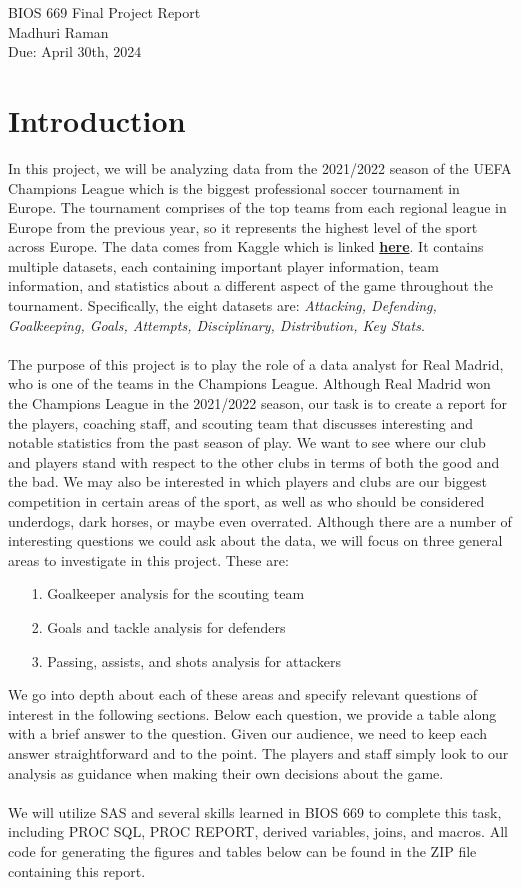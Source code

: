 \documentclass[11pt]{report}
\begin{document}
\begin{center}
	BIOS 669 Final Project Report \\ Madhuri Raman \\ Due: April 30th, 2024
\end{center}

\section*{Introduction}
	In this project, we will be analyzing data from the 2021/2022 season of the UEFA Champions League which is the biggest professional soccer tournament in Europe. The tournament comprises of the top teams from each regional league in Europe from the previous year, so it represents the highest level of the sport across Europe. The data comes from Kaggle which is linked \href{https://www.kaggle.com/datasets/azminetoushikwasi/ucl-202122-uefa-champions-league?select=distributon.csv}{\textbf{here}}. It contains multiple datasets, each containing important player information, team information, and statistics about a different aspect of the game throughout the tournament. Specifically, the eight datasets are: \textit{Attacking, Defending, Goalkeeping, Goals, Attempts, Disciplinary, Distribution, Key Stats}. \\ \\
	The purpose of this project is to play the role of a data analyst for Real Madrid, who is one of the teams in the Champions League. Although Real Madrid won the Champions League in the 2021/2022 season, our task is to create a report for the players, coaching staff, and scouting team that discusses interesting and notable statistics from the past season of play. We want to see where our club and players stand with respect to the other clubs in terms of both the good and the bad. We may also be interested in which players and clubs are our biggest competition in certain areas of the sport, as well as who should be considered underdogs, dark horses, or maybe even overrated. Although there are a number of interesting questions we could ask about the data, we will focus on three general areas to investigate in this project. These are:
			\begin{itemize}
				\item [1.] Goalkeeper analysis for the scouting team
				\item [2.] Goals and tackle analysis for defenders
				\item [3.] Passing, assists, and shots analysis for attackers
			\end{itemize}
		We go into depth about each of these areas and specify relevant questions of interest in the following sections. Below each question, we provide a table along with a brief answer to the question. Given our audience, we need to keep each answer straightforward and to the point. The players and staff simply look to our analysis as guidance when making their own decisions about the game. \\\\
		We will utilize SAS and several skills learned in BIOS 669 to complete this task, including PROC SQL, PROC REPORT, derived variables, joins, and macros. All code for generating the figures and tables below can be found in the ZIP file containing this report.
\end{document}
